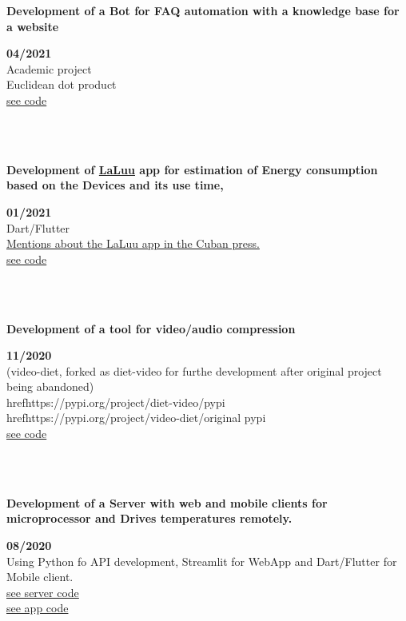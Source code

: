\documentclass{article}
\begin{document}
\begin{minipage}{0.8\textwidth}
\parbox{0.8\linewidth}{\textbf{Development of a Bot for FAQ automation with a knowledge base for a website}} \hfill \textbf{04/2021}\\
Academic project\\
Euclidean dot product\\
\href{https://github.com/JavierOramas/FAQ-Chat-Bot-Nous}{see code}\\
\end{minipage} \hfill {}\\\\
\begin{minipage}{0.8\textwidth}
\parbox{0.8\linewidth}{\textbf{Development of \hyperref[sec:laluu]{LaLuu} app for estimation of Energy consumption based on the Devices and its use time, }} \hfill \textbf{01/2021}\\
Dart/Flutter\\
\hyperref[sec:laluu_press]{Mentions about the LaLuu app in the Cuban press.}\\
\href{https://github.com/geeksLabTech/LaLuu}{see code}\\
\end{minipage} \hfill {}\\\\
\begin{minipage}{0.8\textwidth}
\parbox{0.8\linewidth}{\textbf{Development of a tool for video/audio compression}} \hfill \textbf{11/2020}\\
(video-diet, forked as diet-video for furthe development after original project being abandoned)\\
href{https://pypi.org/project/diet-video/}{pypi}\\
href{https://pypi.org/project/video-diet/}{original pypi}\\
\href{https://github.com/JavierOramas/video-diet}{see code}\\
\end{minipage} \hfill {}\\\\
\begin{minipage}{0.8\textwidth}
\parbox{0.8\linewidth}{\textbf{Development of a Server with web and mobile clients for microprocessor and Drives temperatures remotely.}} \hfill \textbf{08/2020}\\
Using Python fo API development, Streamlit for WebApp and Dart/Flutter for Mobile client.\\
\href{https://github.com/JavierOramas/temperatureMonitor}{see server code}\\
\href{https://github.com/JavierOramas/temperatureMonitor-app}{see app code}\\
\end{minipage} \hfill {}\\\\
\end{document}
